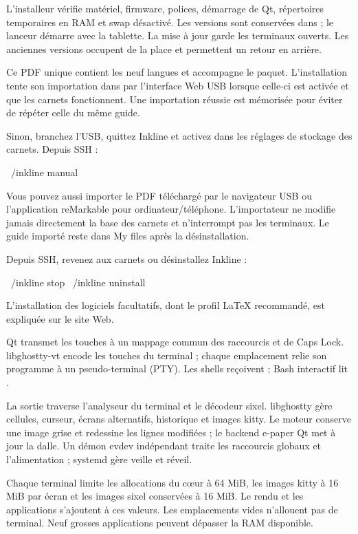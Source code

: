 \InstallLink

L'installeur vérifie matériel, firmware, polices, démarrage de Qt, répertoires
temporaires en RAM et swap désactivé. Les versions sont conservées dans
 ; le lanceur démarre avec la tablette.
La mise à jour garde les terminaux ouverts.  Les anciennes versions occupent de la place
et permettent un retour en arrière.

Ce PDF unique contient les neuf langues et accompagne le paquet. L'installation
tente son importation dans  par l'interface Web USB lorsque
celle-ci est activée et que les carnets fonctionnent. Une importation réussie
est mémorisée pour éviter de répéter celle du même guide.

Sinon, branchez l'USB, quittez Inkline et activez  dans
les réglages de stockage des carnets. Depuis SSH :
\begin{shell}
~/inkline manual
\end{shell}
Vous pouvez aussi importer le PDF téléchargé par le navigateur USB ou l'application
reMarkable pour ordinateur/téléphone. L'importateur ne modifie jamais directement
la base des carnets et n'interrompt pas les terminaux. Le guide importé reste dans
My files après la désinstallation.

Depuis SSH, revenez aux carnets ou désinstallez Inkline :
\begin{shell}
~/inkline stop
~/inkline uninstall
\end{shell}
L'installation des logiciels facultatifs, dont le profil LaTeX recommandé,
est expliquée sur le site Web.

Qt transmet les touches à un mappage commun des raccourcis et de Caps Lock.
libghostty-vt encode les touches du terminal ; chaque emplacement relie son
programme à un pseudo-terminal (PTY). Les shells reçoivent
 ; Bash interactif lit .

La sortie traverse l'analyseur du terminal et le décodeur sixel. libghostty
gère cellules, curseur, écrans alternatifs, historique et images kitty.
Le moteur conserve une image grise et redessine les lignes modifiées ; le
backend e-paper Qt met à jour la dalle. Un démon evdev indépendant traite
les raccourcis globaux et l'alimentation ; systemd gère veille et réveil.

Chaque terminal limite les allocations du cœur à 64 MiB, les images kitty à
16 MiB par écran et les images sixel conservées à 16 MiB. Le rendu et les
applications s'ajoutent à ces valeurs. Les emplacements vides n'allouent pas de
terminal. Neuf grosses applications peuvent dépasser la RAM disponible.

